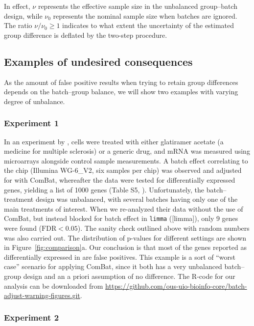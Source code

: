\documentclass{bio}
\newcommand\CITE[1]{\textcolor{CITEcol}{[#1]}}
\begin{document}
In effect, $\nu$ represents the effective sample size in the unbalanced group--batch design, while $\nu_0$ represents the nominal sample size when batches are ignored. The ratio $\nu/\nu_0\ge1$ indicates to what extent the uncertainty of the estimated group difference is deflated by the two-step procedure.


\subsection{Examples of undesired consequences}

As the amount of false positive results when trying to retain group differences depends on the batch--group balance, we will show two examples with varying degree of unbalance. 

\subsubsection{Experiment 1}

In an experiment by \citet{Towfic2014}, cells were treated with either glatiramer acetate (a medicine for multiple sclerosis) or a generic drug, and mRNA was measured using microarrays alongside control sample measurements. A batch effect correlating to the chip (Illumina WG-6\_V2, six samples per chip) was observed and adjusted for with ComBat, whereafter the data were tested for differentially expressed genes, yielding a list of 1000 genes (Table S5, \citealp{Towfic2014}). Unfortunately, the batch--treatment design was unbalanced, with several batches having only one of the main treatments of interest. When we re-analyzed their data without the use of ComBat, but instead blocked for batch effect in \texttt{limma} (\CITE{limma}), only 9 genes were found ($\text{FDR}<0.05$). The sanity check  outlined above with random numbers was also carried out. The distribution of p-values for different settings are shown in Figure~\ref{fig:comparison}a.  Our conclusion is that most of the genes reported as differentially expressed in \citet{Towfic2014} are false positives. This example is a sort of ``worst case'' scenario for applying ComBat, since it both has a very unbalanced batch--group design and an a priori assumption of no difference. The R-code for our analysis can be downloaded from \href{https://github.com/ous-uio-bioinfo-core/batch-adjust-warning-figures.git}{https://github.com/ous-uio-bioinfo-core/batch-adjust-warning-figures.git}.

\subsubsection{Experiment 2}
\end{document}
